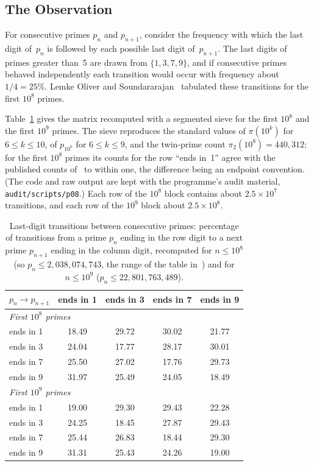 \documentclass[12pt,a4paper]{article}
\theoremstyle{plain}
\theoremstyle{definition}
\theoremstyle{remark}
\begin{document}
\subsection{The Observation}

For consecutive primes $p_n$ and $p_{n+1}$, consider the frequency with which the
last digit of~$p_n$ is followed by each possible last digit of~$p_{n+1}$. The last digits
of primes greater than~5 are drawn from $\{1, 3, 7, 9\}$, and if consecutive primes
behaved independently each transition would occur with frequency about $1/4 = 25\%$.
Lemke Oliver and Soundararajan~\cite{LOS16} tabulated these transitions for the first
$10^8$ primes.

Table~\ref{tab:matrix} gives the matrix recomputed with a segmented sieve for the
first $10^8$ and the first $10^9$ primes. The sieve reproduces the standard values of $\pi(10^k)$ for
$6 \leq k \leq 10$, of $p_{10^k}$ for $6 \leq k \leq 9$, and the twin-prime count
$\pi_2(10^8) = 440{,}312$; for the first $10^8$ primes its counts for the row ``ends in~1''
agree with the published counts of~\cite{LOS16} to within one, the difference being an
endpoint convention. (The code and raw output are kept with the programme's audit
material, \texttt{audit/scripts/p08}.) Each row of the $10^8$ block contains about
$2.5 \times 10^7$ transitions, and each row of the $10^9$ block about $2.5 \times 10^8$.

\begin{table}[htbp]
\centering
\caption{Last-digit transitions between consecutive primes: percentage of transitions
from a prime $p_n$ ending in the row digit to a next prime $p_{n+1}$ ending in the column
digit, recomputed for $n \leq 10^8$ (so $p_n \leq 2{,}038{,}074{,}743$, the range of the
table in~\cite{LOS16}) and for $n \leq 10^9$ ($p_n \leq 22{,}801{,}763{,}489$).}
\label{tab:matrix}
\renewcommand{\arraystretch}{1.2}
\begin{tabular}{lcccc}
\toprule
$p_n \to p_{n+1}$ & ends in 1 & ends in 3 & ends in 7 & ends in 9 \\
\midrule
\multicolumn{5}{l}{\emph{First $10^8$ primes}} \\
ends in 1 & 18.49 & 29.72 & 30.02 & 21.77 \\
ends in 3 & 24.04 & 17.77 & 28.17 & 30.01 \\
ends in 7 & 25.50 & 27.02 & 17.76 & 29.73 \\
ends in 9 & 31.97 & 25.49 & 24.05 & 18.49 \\
\midrule
\multicolumn{5}{l}{\emph{First $10^9$ primes}} \\
ends in 1 & 19.00 & 29.30 & 29.43 & 22.28 \\
ends in 3 & 24.25 & 18.45 & 27.87 & 29.43 \\
ends in 7 & 25.44 & 26.83 & 18.44 & 29.30 \\
ends in 9 & 31.31 & 25.43 & 24.26 & 19.00 \\
\bottomrule
\end{tabular}
\end{table}
\end{document}
